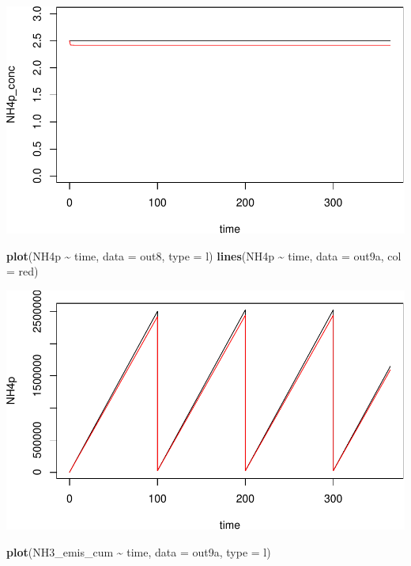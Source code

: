 \documentclass[
]{article}
\newenvironment{Shaded}{\begin{snugshade}}{\end{snugshade}}
\newcommand{\AttributeTok}[1]{\textcolor[rgb]{0.13,0.29,0.53}{#1}}
\newcommand{\FunctionTok}[1]{\textcolor[rgb]{0.13,0.29,0.53}{\textbf{#1}}}
\newcommand{\NormalTok}[1]{#1}
\newcommand{\SpecialCharTok}[1]{\textcolor[rgb]{0.81,0.36,0.00}{\textbf{#1}}}
\newcommand{\StringTok}[1]{\textcolor[rgb]{0.31,0.60,0.02}{#1}}
\begin{document}
\includegraphics{simple_demo_files/figure-latex/unnamed-chunk-64-1.pdf}

\begin{Shaded}
\begin{Highlighting}[]
\FunctionTok{plot}\NormalTok{(NH4p }\SpecialCharTok{\textasciitilde{}}\NormalTok{ time, }\AttributeTok{data =}\NormalTok{ out8, }\AttributeTok{type =} \StringTok{\textquotesingle{}l\textquotesingle{}}\NormalTok{)}
\FunctionTok{lines}\NormalTok{(NH4p }\SpecialCharTok{\textasciitilde{}}\NormalTok{ time, }\AttributeTok{data =}\NormalTok{ out9a, }\AttributeTok{col =} \StringTok{\textquotesingle{}red\textquotesingle{}}\NormalTok{)}
\end{Highlighting}
\end{Shaded}

\includegraphics{simple_demo_files/figure-latex/unnamed-chunk-64-2.pdf}

\begin{Shaded}
\begin{Highlighting}[]
\FunctionTok{plot}\NormalTok{(NH3\_emis\_cum }\SpecialCharTok{\textasciitilde{}}\NormalTok{ time, }\AttributeTok{data =}\NormalTok{ out9a, }\AttributeTok{type =} \StringTok{\textquotesingle{}l\textquotesingle{}}\NormalTok{)}
\end{Highlighting}
\end{Shaded}
\end{document}
